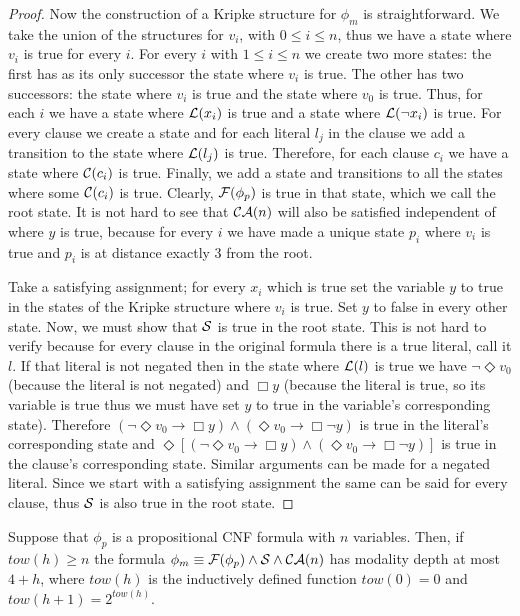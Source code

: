 \documentclass{llncs}
\begin{document}
\begin{proof}
Now the construction of a Kripke structure for $\phi_m$ is straightforward. We
take the union of the structures for $v_i$, with $0\le i\le n$, thus we have a
state where $v_i$ is true for every $i$.  For every $i$ with $1\le i\le n$ we
create two more states: the first has as its only successor the state where
$v_i$ is true.  The other has two successors: the state where $v_i$ is true and
the state where $v_0$ is true. Thus, for each $i$ we have a state where
$\mathcal{L}(x_i)$ is true and a state where $\mathcal{L}(\neg x_i)$ is true. For every clause
we create a state and for each literal $l_j$ in the clause we add a transition
to the state where $\mathcal{L}(l_j)$ is true. Therefore, for each clause $c_i$ we have
a state where $\mathcal{C}(c_i)$ is true. Finally, we add a state and transitions to
all the states where some $\mathcal{C}(c_i)$ is true. Clearly, $\mathcal{F}(\phi_p)$ is true in
that state, which we call the root state. It is not hard to see that $\mathcal{CA}(n)$
will also be satisfied independent of where $y$ is true, because for every $i$
we have made a unique state $p_i$ where $v_i$ is true and $p_i$ is at distance
exactly 3 from the root.

Take a satisfying assignment; for every $x_i$ which is true set the variable
$y$ to true in the states of the Kripke structure where $v_i$ is true. Set $y$
to false in every other state. Now, we must show that $\mathcal{S}$ is true in the
root state. This is not hard to verify because for every clause in the original
formula there is a true literal, call it $l$. If that literal is not negated
then in the state where $\mathcal{L}(l)$ is true we have $\neg \Diamond v_0$ (because
the literal is not negated) and $\Box y$ (because the literal is true, so its
variable is true thus we must have set $y$ to true in the variable's
corresponding state). Therefore $(\neg \Diamond v_0 \to \Box y) \land (\Diamond
v_0 \to \Box \neg y)$ is true in the literal's corresponding state and
$\Diamond \left[ (\neg \Diamond v_0 \to \Box y) \land (\Diamond v_0 \to \Box
\neg y) \right]$ is true in the clause's corresponding state. Similar arguments
can be made for a negated literal. Since we start with a satisfying assignment
the same can be said for every clause, thus $\mathcal{S}$ is also true in the root
state. 

\end{proof}



\begin{lemma} \label{lem:smdepth}

Suppose that $\phi_p$ is a propositional CNF formula with $n$ variables. Then,
if $tow(h)\ge n$ the formula $\phi_m \equiv \mathcal{F}(\phi_p)\land \mathcal{S}\land \mathcal{CA}(n)$
has modality depth at most $4+h$, where $tow(h)$ is the inductively defined
function $tow(0)=0$ and $tow(h+1)=2^{tow(h)}$.

\end{lemma}
\end{document}

